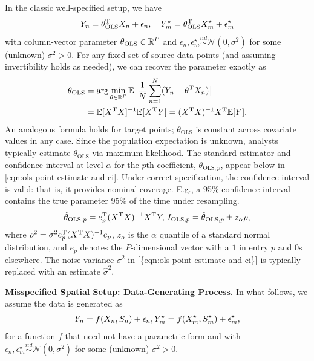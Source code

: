 In the classic well-specified setup, we have
\begin{align}\label{eqn:ols-model}
Y_n = \theta_{\text{OLS}}^{\mathrm{T}} X_n + \epsilon_n, \quad
Y^{\star}_m = \theta_{\text{OLS}}^{\mathrm{T}} X^{\star}_m + \epsilon^{\star}_m
\end{align}
with column-vector parameter $\theta_{\text{OLS}} \in \mathbb{R}^P$ and $\epsilon_n, \epsilon^{\star}_m \stackrel{iid}{\sim} \mathcal{N}(0, \sigma^2)$ for some (unknown) $\sigma^2 > 0$.
For any fixed set of source data points (and assuming invertibility holds as needed), we can recover the parameter exactly as
\begin{align}\label{eqn:ols-estimand}
    \theta_{\text{OLS}} &= \arg\min_{\theta \in \mathbb{R}^P} \mathbb{E}\big[\frac{1}{N}\sum_{n=1}^N (Y_n - \theta^{\mathrm{T}}X_n)\big] \\
    &=\mathbb{E}[X^{\mathrm{T}}X]^{-1}\mathbb{E}[X^{\mathrm{T}}Y]
    =(X^{\mathrm{T}}X)^{-1} X^{\mathrm{T}} \mathbb{E}[Y].
\end{align}
An analogous formula holds for target points; $\theta_{\text{OLS}}$ is constant across covariate values in any case.
Since the population expectation is  unknown, analysts typically estimate $\theta_{\text{OLS}}$ via maximum likelihood. The standard estimator and confidence interval at level $\alpha$ for the $p$th coefficient, $\theta_{\text{OLS}, p}$, appear below in \cref{eqn:ols-point-estimate-and-ci}.
Under correct specification, the confidence interval is valid: that is, it provides nominal coverage. E.g., a 95\% confidence interval contains the true parameter 95\% of the time under resampling. 
\begin{align}
    \hat{\theta}_{\text{OLS}, p}  
    = e_p^{\mathrm{T}}(X^{\mathrm{T}}X)^{-1}X^{\mathrm{T}}Y, \, I_{\text{OLS}, p} = \hat{\theta}_{\text{OLS}, p} \pm z_{\alpha}\rho, \label{eqn:ols-point-estimate-and-ci}
\end{align}
where $\rho^2 = \sigma^2 e_p^{\mathrm{T}}(X^{\mathrm{T}}X)^{-1}e_p$, $z_{\alpha}$ is the $\alpha$ quantile of a standard normal distribution, and $e_p$ denotes the $P$-dimensional vector with a $1$ in entry $p$ and $0$s elsewhere. The noise variance $\sigma^2$ in \cref{{eqn:ols-point-estimate-and-ci}} is typically replaced with an estimate $\hat{\sigma}^2$. %

\textbf{Misspecified Spatial Setup: Data-Generating Process.} In what follows, we assume the data is generated as 
\begin{align}\label{eqn:general-dgp}
    Y_n = f(X_n, S_n) + \epsilon_n, Y^{\star}_m = f(X^{\star}_m, S^{\star}_m) + \epsilon^{\star}_m,
\end{align}
for a function $f$ that need not have a parametric form and with $\epsilon_n, \epsilon^{\star}_m \stackrel{iid}{\sim} \mathcal{N}(0, \sigma^2)$ for some (unknown) $\sigma^2 > 0$.

